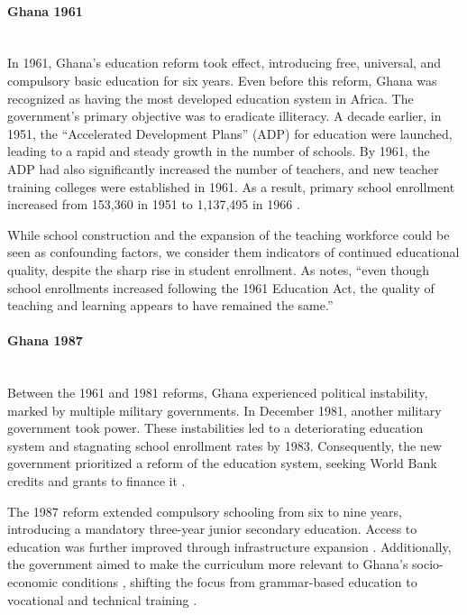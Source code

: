 \paragraph{Ghana 1961} \label{sec:ghana1} \mbox{}\\
In 1961, Ghana's education reform took effect, introducing free, universal, and compulsory basic education for six years. Even before this reform, Ghana was recognized as having the most developed education system in Africa. The government's primary objective was to eradicate illiteracy. A decade earlier, in 1951, the ``Accelerated Development Plans'' (ADP) for education were launched, leading to a rapid and steady growth in the number of schools. By 1961, the ADP had also significantly increased the number of teachers, and new teacher training colleges were established in 1961. As a result, primary school enrollment increased from 153,360 in 1951 to 1,137,495 in 1966 \parencite{akyeampong_educational_2007}.

While school construction and the expansion of the teaching workforce could be seen as confounding factors, we consider them indicators of continued educational quality, despite the sharp rise in student enrollment. As \citet[p.~5]{kadingdi_policy_2006} notes, ``even though school enrollments increased following the 1961 Education Act, the quality of teaching and learning appears to have remained the same.''


\paragraph{Ghana 1987} \label{sec:ghana2} \mbox{}\\
Between the 1961 and 1981 reforms, Ghana experienced political instability, marked by multiple military governments. In December 1981, another military government took power. These instabilities led to a deteriorating education system and stagnating school enrollment rates by 1983. Consequently, the new government prioritized a reform of the education system, seeking World Bank credits and grants to finance it \parencite{kadingdi_policy_2006}.

The 1987 reform extended compulsory schooling from six to nine years, introducing a mandatory three-year junior secondary education. Access to education was further improved through infrastructure expansion \parencite{kadingdi_policy_2006}. Additionally, the government aimed to make the curriculum more relevant to Ghana's socio-economic conditions \parencite{kadingdi_policy_2006}, shifting the focus from grammar-based education to vocational and technical training \parencite{akyeampong_educational_2007}.

